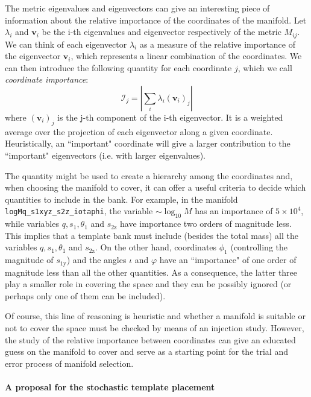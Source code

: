 \documentclass[twocolumn,showpacs,preprintnumbers,nofootinbib,prd,
superscriptaddress,10pt]{revtex4-2}
\begin{document}
The metric eigenvalues and eigenvectors can give an interesting piece of information about the relative importance of the coordinates of the manifold.
Let $\lambda_i$ and $\mathbf{v}_i$ be the i-th eigenvalues and eigenvector respectively of the metric $M_{ij}$.
We can think of each eigenvector $\lambda_i$ as a measure of the relative importance of the eigenvector $\mathbf{v}_i$, which represents a linear combination of the coordinates.
We can then introduce the following quantity for each coordinate $j$, which we call {\it coordinate importance}:
\begin{equation}
\mathcal{I}_j = \left| \sum_i \lambda_i (\mathbf{v}_i)_j \right|
\end{equation}
where $(\mathbf{v}_i)_j$ is the j-th component of the i-th eigenvector.
It is a weighted average over the projection of each eigenvector along a given coordinate. Heuristically, an ``important" coordinate will give a larger contribution to the ``important" eigenvectors (i.e. with larger eigenvalues).

The quantity might be used to create a hierarchy among the coordinates and, when choosing the manifold to cover, it can offer a useful criteria to decide which quantities to include in the bank.
For example, in the manifold \texttt{logMq\_s1xyz\_s2z\_iotaphi}, the variable $\sim \log_{10}M$ has an importance of $5\times 10^4$, while variables $q, s_1, \theta_1$ and $s_\text{2z}$ have importance two orders of magnitude less. This implies that a template bank must include (besides the total mass) all the variables $q, s_1, \theta_1$ and $s_\text{2z}$.
On the other hand, coordinates $\phi_1$ (controlling the magnitude of $s_\text{1y}$) and the angles $\iota$ and $\varphi$ have an ``importance" of one order of magnitude less than all the other quantities. As a consequence, the latter three play a smaller role in covering the space and they can be possibly ignored (or perhaps only one of them can be included).

Of course, this line of reasoning is heuristic and whether a manifold is suitable or not to cover the space must be checked by means of an injection study. However, the study of the relative importance between coordinates can give an educated guess on the manifold to cover and serve as a starting point for the trial and error process of manifold selection.

\paragraph{A proposal for the stochastic template placement}
\end{document}
